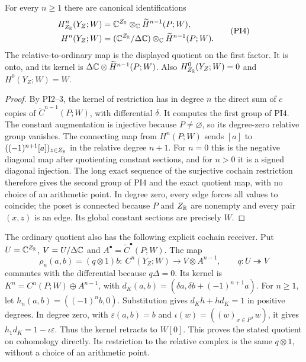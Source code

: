 \begin{theorem}
For every $n\ge1$ there are canonical identifications
\[
 \begin{aligned}
 H^n_{Z_\mathbb R}(Y_Z;W)&=\mathbb C^{Z_\mathbb R}\otimes_\mathbb C
                         \widetilde H^{n-1}(P;W),\\
 H^n(Y_Z;W)&=(\mathbb C^{Z_\mathbb R}/\Delta\mathbb C)\otimes_\mathbb C
                         \widetilde H^{n-1}(P;W).
 \end{aligned}
 \tag{PI4}\label{pi:groups}
\]
The relative-to-ordinary map is the displayed quotient on the
first factor. It is onto, and its kernel is
$\Delta\mathbb C\otimes\widetilde H^{n-1}(P;W)$.
Also $H^0_{Z_\mathbb R}(Y_Z;W)=0$ and $H^0(Y_Z;W)=W$.
\end{theorem}
\begin{proof}
By PI2--3, the kernel of restriction has in degree $n$ the
direct sum of $c$ copies of $\widetilde C^{n-1}(P;W)$, with
differential $\delta$. It computes the first group of PI4.
The constant augmentation is injective because $P\ne\varnothing$,
so its degree-zero relative group vanishes. The connecting map
from $H^n(P;W)$ sends $[a]$ to
$((-1)^{n+1}[a])_{z\in Z_\mathbb R}$ in the relative degree $n+1$.
For $n=0$ this is the negative diagonal map after quotienting constant
sections, and for $n>0$ it is a signed diagonal injection.
The long exact sequence of the surjective cochain restriction
therefore gives the second group of PI4 and the exact quotient
map, with no choice of an arithmetic point. In degree zero,
every edge forces all values to coincide; the poset is connected
because $P$ and $Z_\mathbb R$ are nonempty and every pair $(x,z)$ is an
edge. Its global constant sections are precisely $W$.
\end{proof}

The ordinary quotient also has the following explicit cochain
receiver. Put $U=\mathbb C^{Z_\mathbb R}$, $V=U/\Delta\mathbb C$ and
$A^\bullet=\widetilde C^\bullet(P;W)$. The map
\[
 \rho_n(a,b)=(q\otimes1)b:\ C^n(Y_Z;W)\longrightarrow
                      V\otimes A^{n-1},\qquad q:U\twoheadrightarrow V
 \tag{PI7}\label{pi:cochain-quotient}
\]
commutes with the differential because $q\Delta=0$. Its kernel
is $K^n=C^n(P;W)\oplus A^{n-1}$, with
$d_K(a,b)=(\delta a,\delta b+(-1)^{n+1}a)$.
For $n\ge1$, let $h_n(a,b)=((-1)^n b,0)$.
Substitution gives $d_Kh+hd_K=1$ in positive degrees.
In degree zero, with $\varepsilon(a,b)=b$ and
$\iota(w)=((w)_{x\in P},w)$, it gives
$h_1d_K=1-\iota\varepsilon$. Thus the kernel retracts to
$W[0]$. This proves the stated quotient on cohomology directly.
Its restriction to the relative complex is the same $q\otimes1$,
without a choice of an arithmetic point.

